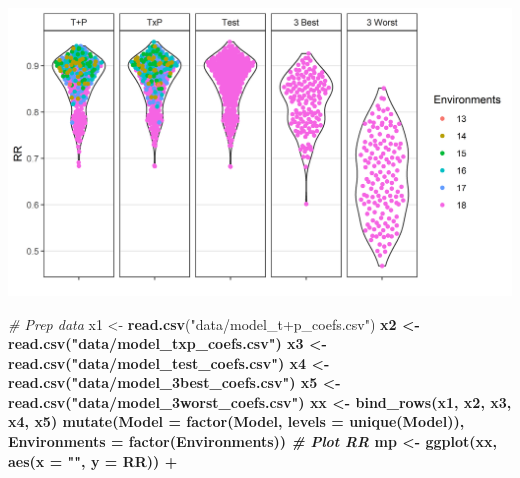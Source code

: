 \documentclass[
]{article}
\newenvironment{Shaded}{\begin{snugshade}}{\end{snugshade}}
\newcommand{\CommentTok}[1]{\textcolor[rgb]{0.56,0.35,0.01}{\textit{#1}}}
\newcommand{\DataTypeTok}[1]{\textcolor[rgb]{0.13,0.29,0.53}{#1}}
\newcommand{\KeywordTok}[1]{\textcolor[rgb]{0.13,0.29,0.53}{\textbf{#1}}}
\newcommand{\NormalTok}[1]{#1}
\newcommand{\OperatorTok}[1]{\textcolor[rgb]{0.81,0.36,0.00}{\textbf{#1}}}
\newcommand{\StringTok}[1]{\textcolor[rgb]{0.31,0.60,0.02}{#1}}
\begin{document}
\includegraphics{Additional/Model/Model_pvalues.png}

\begin{Shaded}
\begin{Highlighting}[]
\CommentTok{# Prep data}
\NormalTok{x1 <-}\StringTok{ }\KeywordTok{read.csv}\NormalTok{(}\StringTok{"data/model_t+p_coefs.csv"}\NormalTok{) }\OperatorTok{%
\NormalTok{x2 <-}\StringTok{ }\KeywordTok{read.csv}\NormalTok{(}\StringTok{"data/model_txp_coefs.csv"}\NormalTok{) }\OperatorTok{%
\NormalTok{x3 <-}\StringTok{ }\KeywordTok{read.csv}\NormalTok{(}\StringTok{"data/model_test_coefs.csv"}\NormalTok{) }\OperatorTok{%
\NormalTok{x4 <-}\StringTok{ }\KeywordTok{read.csv}\NormalTok{(}\StringTok{"data/model_3best_coefs.csv"}\NormalTok{)  }\OperatorTok{%
\NormalTok{x5 <-}\StringTok{ }\KeywordTok{read.csv}\NormalTok{(}\StringTok{"data/model_3worst_coefs.csv"}\NormalTok{)  }\OperatorTok{%
\NormalTok{xx <-}\StringTok{ }\KeywordTok{bind_rows}\NormalTok{(x1, x2, x3, x4, x5) }\OperatorTok{%
\StringTok{  }\KeywordTok{mutate}\NormalTok{(}\DataTypeTok{Model =} \KeywordTok{factor}\NormalTok{(Model, }\DataTypeTok{levels =} \KeywordTok{unique}\NormalTok{(Model)),}
         \DataTypeTok{Environments =} \KeywordTok{factor}\NormalTok{(Environments))}
\CommentTok{# Plot RR}
\NormalTok{mp <-}\StringTok{ }\KeywordTok{ggplot}\NormalTok{(xx, }\KeywordTok{aes}\NormalTok{(}\DataTypeTok{x =} \StringTok{""}\NormalTok{, }\DataTypeTok{y =}\NormalTok{ RR)) }\OperatorTok{+}\StringTok{ }
}}}}}}
\end{Highlighting}
\end{Shaded}
\end{document}
